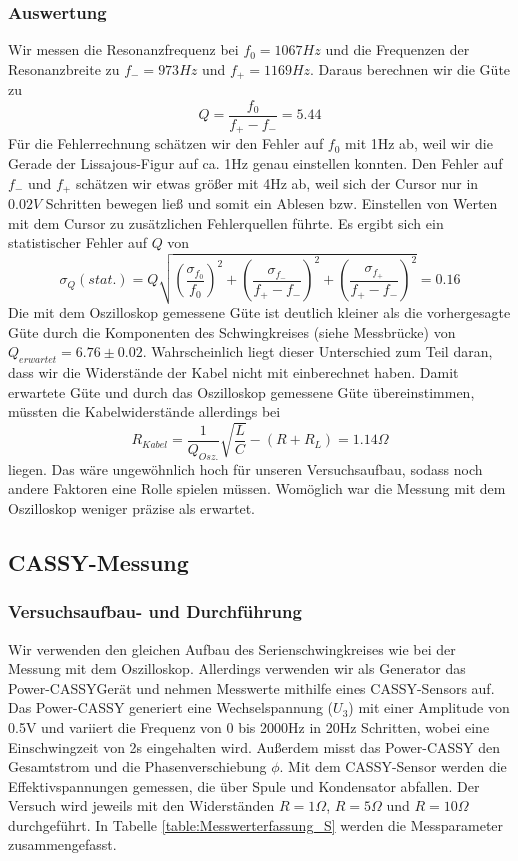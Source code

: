 \documentclass[12pt,a4paper]{article}
\begin{document}
\subsubsection{Auswertung}
Wir messen die Resonanzfrequenz bei $f_0=1067Hz$ und die Frequenzen der Resonanzbreite zu $f_-=973Hz$ und $f_+=1169Hz$. Daraus berechnen wir die Güte zu
\begin{equation}
Q=\frac{f_0}{f_+-f_-}=5.44
\end{equation}
Für die Fehlerrechnung schätzen wir den Fehler auf $f_0$ mit 1Hz ab, weil wir die Gerade der Lissajous-Figur auf ca. 1Hz genau einstellen konnten. Den Fehler auf $f_-$ und $f_+$ schätzen wir etwas größer mit 4Hz ab, weil sich der Cursor nur in $0.02V$ Schritten bewegen ließ und somit ein Ablesen bzw. Einstellen von Werten mit dem Cursor zu zusätzlichen Fehlerquellen führte. Es ergibt sich ein statistischer Fehler auf $Q$ von
\begin{equation}
\sigma_Q(stat.)=Q\sqrt{\left(\frac{\sigma_{f_0}}{f_0}\right)^2+\left(\frac{\sigma_{f_-}}{f_+-f_-}\right)^2+\left(\frac{\sigma_{f_+}}{f_+-f_-}\right)^2}=0.16
\end{equation}
Die mit dem Oszilloskop gemessene Güte ist deutlich kleiner als die vorhergesagte Güte durch die Komponenten des Schwingkreises (siehe Messbrücke) von $Q_{erwartet}=6.76\pm0.02$. Wahrscheinlich liegt dieser Unterschied zum Teil daran, dass wir die Widerstände der Kabel nicht mit einberechnet haben. Damit erwartete Güte und durch das Oszilloskop gemessene Güte übereinstimmen, müssten die Kabelwiderstände allerdings bei
\begin{equation}
R_{Kabel}=\frac{1}{Q_{Osz.}}\sqrt{\frac{L}{C}}-(R+R_L)=1.14\Omega
\end{equation}
liegen. Das wäre ungewöhnlich hoch für unseren Versuchsaufbau, sodass noch andere Faktoren eine Rolle spielen müssen. Womöglich war die Messung mit dem Oszilloskop weniger präzise als erwartet.
\subsection{CASSY-Messung}
\subsubsection{Versuchsaufbau- und Durchführung}
Wir verwenden den gleichen Aufbau des Serienschwingkreises wie bei der Messung mit dem Oszilloskop. Allerdings verwenden wir als Generator das Power-CASSYGerät und nehmen Messwerte mithilfe eines CASSY-Sensors auf. Das Power-CASSY generiert eine Wechselspannung ($U_3$) mit einer Amplitude von 0.5V und variiert die Frequenz von 0 bis 2000Hz in 20Hz Schritten, wobei eine Einschwingzeit von 2s eingehalten wird. Außerdem misst das Power-CASSY den Gesamtstrom und die Phasenverschiebung $\phi$. Mit dem CASSY-Sensor werden die Effektivspannungen gemessen, die über Spule und Kondensator abfallen. Der Versuch wird jeweils mit den Widerständen $R=1\Omega$, $R=5\Omega$ und $R=10\Omega$ durchgeführt. In Tabelle \ref{table:Messwerterfassung_S} werden die Messparameter zusammengefasst.
\end{document}
